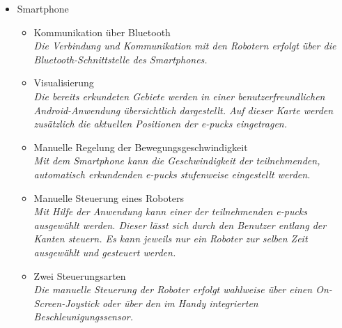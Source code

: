 \documentclass[10pt,a4paper]{article}
\begin{document}
\begin{itemize}
				\item Smartphone
				\begin{itemize}
					\item Kommunikation über Bluetooth
						\\ \textsl{Die Verbindung und Kommunikation mit den Robotern erfolgt über die Bluetooth-Schnittstelle des
							Smartphones.}
					\item Visualisierung
						\\ \textsl{Die bereits erkundeten Gebiete werden in einer benutzerfreundlichen Android-Anwendung übersichtlich
							dargestellt. Auf dieser Karte werden zusätzlich die aktuellen Positionen der e-pucks eingetragen.}
					\item Manuelle Regelung der Bewegungsgeschwindigkeit
						\\ \textsl{Mit dem Smartphone kann die Geschwindigkeit der teilnehmenden, automatisch erkundenden e-pucks stufenweise 										eingestellt werden.}	
					\item Manuelle Steuerung eines Roboters
						\\ \textsl{Mit Hilfe der Anwendung kann einer der teilnehmenden e-pucks ausgewählt werden. Dieser lässt sich
							durch den Benutzer entlang der Kanten steuern. Es kann jeweils nur ein Roboter zur selben Zeit ausgewählt
							und gesteuert werden.}		
					\item Zwei Steuerungsarten
						\\ \textsl{Die manuelle Steuerung der Roboter erfolgt wahlweise über einen On-Screen-Joystick oder über
							den im Handy integrierten Beschleunigungssensor.}											
				\end{itemize}
			\end{itemize}
\end{document}
